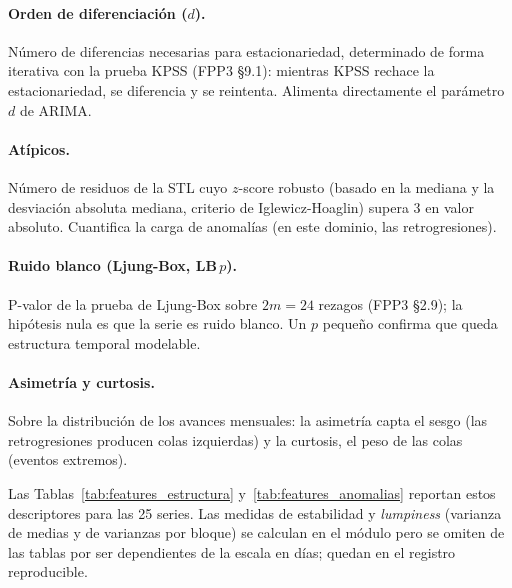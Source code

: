\documentclass[12pt,letterpaper]{report}
\begin{document}
\paragraph{Orden de diferenciación ($d$).} Número de diferencias necesarias para
estacionariedad, determinado de forma iterativa con la prueba KPSS (FPP3 §9.1):
mientras KPSS rechace la estacionariedad, se diferencia y se reintenta. Alimenta
directamente el parámetro $d$ de ARIMA.

\paragraph{Atípicos.} Número de residuos de la STL cuyo $z$-score robusto (basado en
la mediana y la desviación absoluta mediana, criterio de Iglewicz-Hoaglin) supera 3
en valor absoluto. Cuantifica la carga de anomalías (en este dominio, las
retrogresiones).

\paragraph{Ruido blanco (Ljung-Box, LB\,$p$).} P-valor de la prueba de Ljung-Box
sobre $2m=24$ rezagos (FPP3 §2.9); la hipótesis nula es que la serie es ruido blanco.
Un $p$ pequeño confirma que queda estructura temporal modelable.

\paragraph{Asimetría y curtosis.} Sobre la distribución de los avances mensuales:
la asimetría capta el sesgo (las retrogresiones producen colas izquierdas) y la
curtosis, el peso de las colas (eventos extremos).

Las Tablas~\ref{tab:features_estructura} y~\ref{tab:features_anomalias} reportan estos
descriptores para las 25 series. Las medidas de estabilidad y \textit{lumpiness}
(varianza de medias y de varianzas por bloque) se calculan en el módulo pero se omiten
de las tablas por ser dependientes de la escala en días; quedan en el registro
reproducible.
\end{document}
